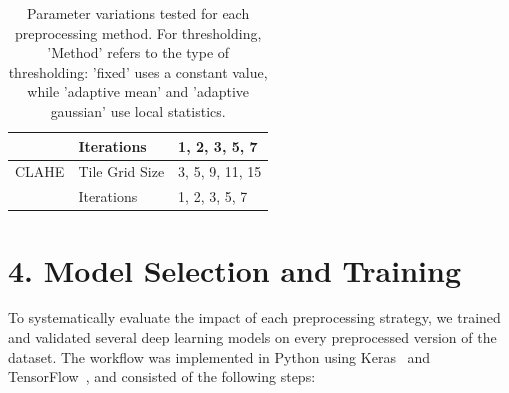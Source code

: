 \documentclass[12pt]{article}
\begin{document}
\begin{table}[H]
\begin{tabular}{|l|l|l|}
                             & Iterations         & 1, 2, 3, 5, 7                           \\
        \hline
        CLAHE                & Tile Grid Size     & 3, 5, 9, 11, 15                         \\
                             & Iterations         & 1, 2, 3, 5, 7                           \\
        \hline
    \end{tabular}
    \caption{Parameter variations tested for each preprocessing method. For thresholding, 'Method' refers to the type of thresholding: 'fixed' uses a constant value, while 'adaptive mean' and 'adaptive gaussian' use local statistics.}
    \label{tab:preprocessing_params}
\end{table}
\renewcommand{\arraystretch}{1.0}

\section*{4. Model Selection and Training}

To systematically evaluate the impact of each preprocessing strategy, we trained and validated several deep learning models on every preprocessed version of the dataset. The workflow was implemented in Python using Keras~\cite{keras} and TensorFlow~\cite{tensorflow}, and consisted of the following steps:
\end{document}
